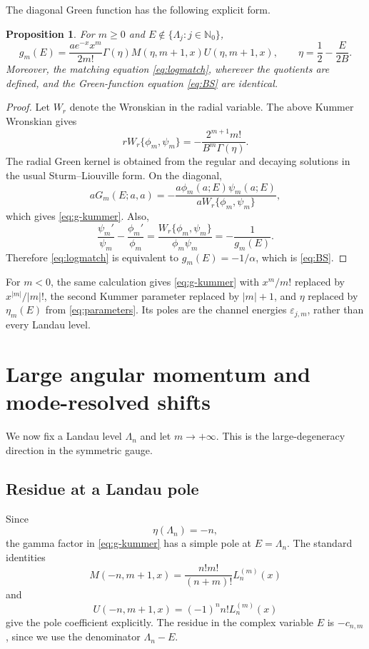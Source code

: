 \documentclass[12pt,a4paper]{article}
\numberwithin{equation}{section}
\newtheorem{prop}[thm]{Proposition}
\theoremstyle{remark}
\theoremstyle{definition}
\newcommand{\N}{\mathbb N}
\newcommand{\Mfun}{M}
\newcommand{\Ufun}{U}
\begin{document}
The diagonal Green function has the following explicit form.

\begin{prop}\label{prop:explicit-g}
For $m\ge0$ and $E\notin\{\Lambda_j:j\in\N_0\}$,
\begin{equation}\label{eq:g-kummer}
g_m(E)
=\frac{a e^{-x}x^m}{2m!}
\Gamma(\eta)
\Mfun(\eta,m+1,x)
\Ufun(\eta,m+1,x),
\qquad
\eta=\frac12-\frac{E}{2B}.
\end{equation}
Moreover, the matching equation \eqref{eq:logmatch}, wherever the quotients are defined, and the Green-function
equation \eqref{eq:BS} are identical.
\end{prop}

\begin{proof}
Let $W_r$ denote the Wronskian in the radial variable. The above Kummer
Wronskian gives
$$
rW_r\{\phi_m,\psi_m\}
=-\frac{2^{m+1}m!}{B^m\Gamma(\eta)}.
$$
The radial Green kernel is obtained from the regular and decaying solutions in
the usual Sturm--Liouville form. On the diagonal,
$$
aG_m(E;a,a)
=-\frac{a\phi_m(a;E)\psi_m(a;E)}
{aW_r\{\phi_m,\psi_m\}},
$$
which gives \eqref{eq:g-kummer}. Also,
$$
\frac{\psi_m'}{\psi_m}-\frac{\phi_m'}{\phi_m}
=\frac{W_r\{\phi_m,\psi_m\}}{\phi_m\psi_m}
=-\frac{1}{g_m(E)}.
$$
Therefore \eqref{eq:logmatch} is equivalent to
$g_m(E)=-1/\alpha$, which is \eqref{eq:BS}.
\end{proof}

For $m<0$, the same calculation gives \eqref{eq:g-kummer} with
$x^m/m!$ replaced by $x^{|m|}/|m|!$, the second Kummer parameter
replaced by $|m|+1$, and $\eta$ replaced by $\eta_m(E)$ from
\eqref{eq:parameters}. Its poles are the channel energies
$\varepsilon_{j,m}$, rather than every Landau level.

\section{Large angular momentum and mode-resolved shifts}\label{sec:asym}

We now fix a Landau level $\Lambda_n$ and let $m\to+\infty$. This is the
large-degeneracy direction in the symmetric gauge.

\subsection{Residue at a Landau pole}

Since
$$
\eta(\Lambda_n)=-n,
$$
the gamma factor in \eqref{eq:g-kummer} has a simple pole at
$E=\Lambda_n$. The standard identities \cite[Eq.~13.6.19]{DLMF}
$$
\Mfun(-n,m+1,x)
=\frac{n!m!}{(n+m)!}L_n^{(m)}(x)
$$
and
$$
\Ufun(-n,m+1,x)
=(-1)^n n!L_n^{(m)}(x)
$$
give the pole coefficient explicitly. The residue in the complex variable
$E$ is $-c_{n,m}$, since we use the denominator $\Lambda_n-E$.
\end{document}

